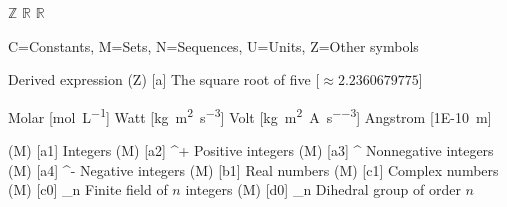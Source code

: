 
\DeclareMathOperator{\indicator} {\mathbf{1}}
\DeclareMathOperator{\mean} {mean}
\DeclareMathOperator{\std} {std}
\DeclareMathOperator{\sgn} {sgn}
\NewDocumentCommand \Z {} { \ensuremath{\mathbb{Z}} }
\NewDocumentCommand \R {} { \ensuremath{\mathbb{R}} }
\NewDocumentCommand \C {} { \ensuremath{\mathbb{R}} }

\DeclareSIQualifier{}  %
\DeclareSIQualifier{}
\DeclareSIUnit{}
\DeclareSIUnit{}
\DeclareSIUnit{}
\DeclareSIUnit\angstrom{\AA}



\SetNomGroups
{
    C=Constants,
    M=Sets,
    N=Sequences,
    U=Units,
    Z=Other symbols
}




     {Derived expression}
\NomMath (Z) [a] {} {The square root of five} [$\approx 2.2360679775$]

 {Molar} [\unit{\mol\per\liter}]
 {Watt} [\unit{\kilogram \meter \squared \per \second \cubed}]
 {Volt} [\unit{\kilogram \meter \squared \per \ampere \per \second \cubed}]
\NomUnit{\AA} {Angstrom} [\qty{1E-10}{\meter}]

\NomMath(M) [a1] {\Z} {Integers}
\NomMath(M) [a2] {\Z^+} {Positive integers}
\NomMath(M) [a3] {\Z^{}} {Nonnegative integers}
\NomMath(M) [a4] {\Z^-} {Negative integers}
\NomMath(M) [b1] {\Z} {Real numbers}
\NomMath(M) [c1] {\C} {Complex numbers}
\NomMath(M) [c0] {\Z_n} {Finite field of $n$ integers}
\NomMath(M) [d0] {_n} {Dihedral group of order $n$}

